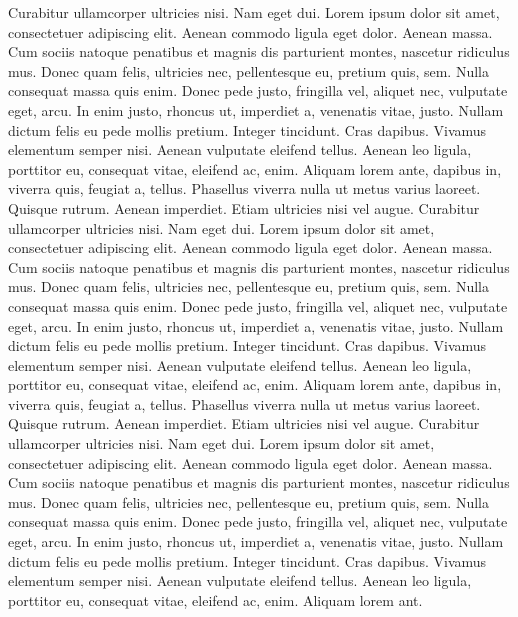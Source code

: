 \documentclass[
    12pt,
    letterpaper,
    oneside,
    noraggedright
]{turabian-researchpaper}
\begin{document}
Curabitur ullamcorper ultricies nisi. Nam eget dui. Lorem ipsum dolor
sit amet, consectetuer adipiscing elit. Aenean commodo ligula eget
dolor. Aenean massa. Cum sociis natoque penatibus et magnis dis
parturient montes, nascetur ridiculus mus. Donec quam felis, ultricies
nec, pellentesque eu, pretium quis, sem. Nulla consequat massa quis
enim. Donec pede justo, fringilla vel, aliquet nec, vulputate eget,
arcu. In enim justo, rhoncus ut, imperdiet a, venenatis vitae, justo.
Nullam dictum felis eu pede mollis pretium. Integer tincidunt. Cras
dapibus. Vivamus elementum semper nisi. Aenean vulputate eleifend
tellus. Aenean leo ligula, porttitor eu, consequat vitae, eleifend ac,
enim. Aliquam lorem ante, dapibus in, viverra quis, feugiat a, tellus.
Phasellus viverra nulla ut metus varius laoreet. Quisque rutrum. Aenean
imperdiet. Etiam ultricies nisi vel augue. Curabitur ullamcorper
ultricies nisi. Nam eget dui. Lorem ipsum dolor sit amet, consectetuer
adipiscing elit. Aenean commodo ligula eget dolor. Aenean massa. Cum
sociis natoque penatibus et magnis dis parturient montes, nascetur
ridiculus mus. Donec quam felis, ultricies nec, pellentesque eu, pretium
quis, sem. Nulla consequat massa quis enim. Donec pede justo, fringilla
vel, aliquet nec, vulputate eget, arcu. In enim justo, rhoncus ut,
imperdiet a, venenatis vitae, justo. Nullam dictum felis eu pede mollis
pretium. Integer tincidunt. Cras dapibus. Vivamus elementum semper nisi.
Aenean vulputate eleifend tellus. Aenean leo ligula, porttitor eu,
consequat vitae, eleifend ac, enim. Aliquam lorem ante, dapibus in,
viverra quis, feugiat a, tellus. Phasellus viverra nulla ut metus varius
laoreet. Quisque rutrum. Aenean imperdiet. Etiam ultricies nisi vel
augue. Curabitur ullamcorper ultricies nisi. Nam eget dui. Lorem ipsum
dolor sit amet, consectetuer adipiscing elit. Aenean commodo ligula eget
dolor. Aenean massa. Cum sociis natoque penatibus et magnis dis
parturient montes, nascetur ridiculus mus. Donec quam felis, ultricies
nec, pellentesque eu, pretium quis, sem. Nulla consequat massa quis
enim. Donec pede justo, fringilla vel, aliquet nec, vulputate eget,
arcu. In enim justo, rhoncus ut, imperdiet a, venenatis vitae, justo.
Nullam dictum felis eu pede mollis pretium. Integer tincidunt. Cras
dapibus. Vivamus elementum semper nisi. Aenean vulputate eleifend
tellus. Aenean leo ligula, porttitor eu, consequat vitae, eleifend ac,
enim. Aliquam lorem ant.
\end{document}
